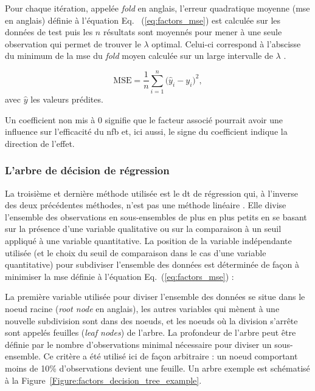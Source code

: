 Pour chaque itération, appelée \textit{fold} en anglais, l'erreur quadratique moyenne (\gls{mse} en anglais) définie à l'équation Eq.
~(\ref{eq:factors_mse}) est calculée sur les données de test
puis les $n$ résultats sont moyennés pour mener à une seule observation qui permet de trouver le $\lambda$ optimal. Celui-ci correspond à l'abscisse du minimum de la \gls{mse} 
du \textit{fold} moyen calculée sur un large intervalle de $\lambda$ \citep{James2013}. 

\begin{equation}
\label{eq:factors_mse}
\text{MSE} = \frac{1}{n}\sum_{i=1}^{n} \Big(\hat{y}_i - {y}_i\Big)^2,
\end{equation}
avec $\hat{y}$ les valeurs prédites.

Un coefficient non mis à 0 signifie que le facteur associé pourrait avoir une influence sur l'efficacité du \gls{nfb} et, ici aussi, 
le signe du coefficient indique la direction de l'effet.

\subsubsection{L'arbre de décision de régression}

La troisième et dernière méthode utilisée est le \gls{dt} de régression qui, à l'inverse des deux précédentes méthodes, n'est pas une méthode 
linéaire \citep{Quinlan1986}. Elle divise l'ensemble des observations en sous-ensembles de plus en plus petits en se basant sur la présence 
d'une variable qualitative ou sur la comparaison à un seuil appliqué à une variable quantitative. La position de la variable indépendante utilisée (et le
choix du seuil de comparaison dans le cas d'une variable quantitative) pour subdiviser l'ensemble des données est déterminée de façon à minimiser la
\gls{mse} définie à l'équation Eq.~(\ref{eq:factors_mse}) :

La première variable utilisée pour diviser l'ensemble des données se situe dans le noeud racine (\textit{root node} en anglais), les autres
variables qui mènent à une nouvelle subdivision sont dans des noeuds, et les noeuds où la division s'arrête sont appelés
feuilles (\textit{leaf nodes}) de l'arbre. La profondeur de l'arbre peut être définie par le nombre d'observations minimal nécessaire
pour diviser un sous-ensemble. Ce critère a été utilisé ici de façon arbitraire : un noeud comportant moins de 10\% d'observations devient une feuille. 
Un arbre exemple est schématisé à la Figure~\ref{Figure:factors_decision_tree_example}.


